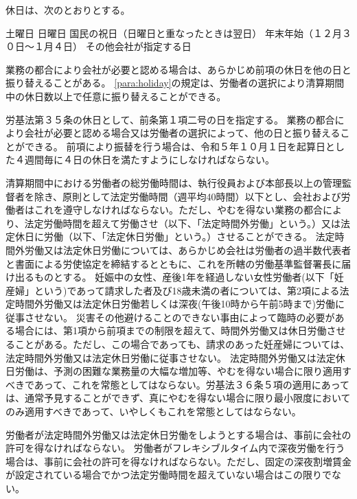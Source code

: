 \documentclass[10pt,a4paper,uplatex]{jsarticle}
\begin{document}
休日は、次のとおりとする。
\label{para:holiday}
\begin{enumerate}
    \itm 土曜日
    \itm 日曜日
    \itm 国民の祝日（日曜日と重なったときは翌日）
    \itm 年末年始（１２月３０日～１月４日）
    \itm その他会社が指定する日
\end{enumerate}
\term
業務の都合により会社が必要と認める場合は、あらかじめ前項の休日を他の日と振り替えることがある。
\term
\ref{para:holiday}の規定は、労働者の選択により清算期間中の休日数以上で任意に振り替えることができる。

\label{para:legal_holiday}
労基法第３５条の休日として、前条第１項二号の日を指定する。
\term 業務の都合により会社が必要と認める場合又は労働者の選択によって、他の日と振り替えることができる。
\term 前項により振替を行う場合は、令和５年１０月１日を起算日とした４週間毎に４日の休日を満たすようにしなければならない。

清算期間中における労働者の総労働時間は、執行役員および本部長以上の管理監督者を除き、原則として法定労働時間（週平均40時間）以下とし、会社および労働者はこれを遵守しなければならない。ただし、やむを得ない業務の都合により、法定労働時間を超えて労働させ（以下、「法定時間外労働」という。）又は法定休日に労働（以下、「法定休日労働」という。）させることができる。
\term 法定時間外労働又は法定休日労働については、あらかじめ会社は労働者の過半数代表者と書面による労使協定を締結するとともに、これを所轄の労働基準監督署長に届け出るものとする。
\term 妊娠中の女性、産後1年を経過しない女性労働者(以下「妊産婦」という)であって請求した者及び18歳未満の者については、第2項による法定時間外労働又は法定休日労働若しくは深夜(午後10時から午前5時まで)労働に従事させない。
\term 災害その他避けることのできない事由によって臨時の必要がある場合には、第1項から前項までの制限を超えて、時間外労働又は休日労働させることがある。ただし、この場合であっても、請求のあった妊産婦については、法定時間外労働又は法定休日労働に従事させない。
\term 法定時間外労働又は法定休日労働は、予測の困難な業務量の大幅な増加等、やむを得ない場合に限り適用すべきであって、これを常態としてはならない。労基法３６条５項の適用にあっては、通常予見することができず、真にやむを得ない場合に限り最小限度においてのみ適用すべきであって、いやしくもこれを常態としてはならない。

労働者が法定時間外労働又は法定休日労働をしようとする場合は、事前に会社の許可を得なければならない。
\term 労働者がフレキシブルタイム内で深夜労働を行う場合は、事前に会社の許可を得なければならない。ただし、固定の深夜割増賃金が設定されている場合でかつ法定労働時間を超えていない場合はこの限りでない。
\end{document}
